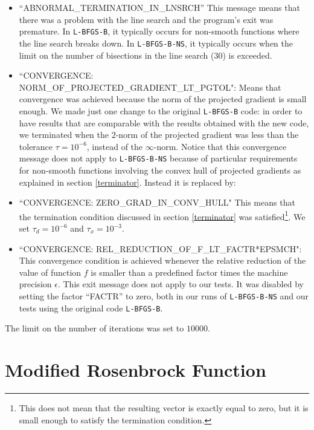 \begin{itemize}

\item ``ABNORMAL\_TERMINATION\_IN\_LNSRCH'' This message means that there was a problem with the line search and the program's exit was premature. In \texttt{L-BFGS-B}, it typically occurs for non-smooth functions where the line search breaks down. In \texttt{L-BFGS-B-NS}, it typically occurs when the limit on the number of bisections in the line search ($30$) is exceeded.

\item ``CONVERGENCE: NORM\_OF\_PROJECTED\_GRADIENT\_LT\_PGTOL": Means that convergence was achieved because the norm of the projected gradient is small enough. We made just one change to the original \texttt{L-BFGS-B} code: in order to have results that are comparable with the results obtained with the new code, we terminated when the $2$-norm of the projected gradient was less than the tolerance $\tau =10^{-6}$, instead of the $\infty$-norm. Notice that this convergence message does not apply to \texttt{L-BFGS-B-NS} because of particular requirements for non-smooth functions involving the convex hull of projected gradients as explained in section \ref{terminator}. Instead it is replaced by:

\item ``CONVERGENCE: ZERO\_GRAD\_IN\_CONV\_HULL" This means that the termination condition discussed in section \ref{terminator} was satisfied\footnote{This does not mean that the resulting vector is exactly equal to zero, but it is small enough to satisfy the termination condition.}. We set $\tau_d = 10^{-6}$ and $\tau_x = 10^{-3}$.

\item ``CONVERGENCE: REL\_REDUCTION\_OF\_F\_LT\_FACTR*EPSMCH": This convergence condition is achieved whenever the relative reduction of the value of function $f$ is smaller than a predefined factor times the machine precision $\epsilon$. This exit message does not apply to our tests. It was disabled by setting the factor ``FACTR'' to zero, both in our runs of \texttt{L-BFGS-B-NS} and our tests using the original code \texttt{L-BFGS-B}.

\end{itemize}

The limit on the number of iterations was set to $10000$.

\section{Modified Rosenbrock Function} \label{ros}

